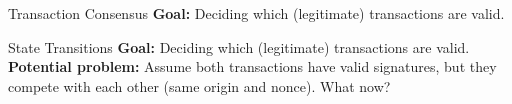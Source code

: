 \documentclass[]{beamer}
\begin{document}
\begin{frame}{Transaction Consensus}
\textbf{Goal:} Deciding which (legitimate) transactions are \textcolor{focus}{valid}.\\
\vspace{1em}
\end{frame}

\begin{frame}{State Transitions}
	\textbf{Goal:} Deciding which (legitimate) transactions are \textcolor{focus}{valid}. \\
\vspace{1em}
\textbf{Potential problem:} Assume both transactions have valid signatures, but they compete with each other (same origin and nonce). What now? \\
\begin{figure}[h!]
	\center
	
\end{figure}


\end{frame}
\end{document}
